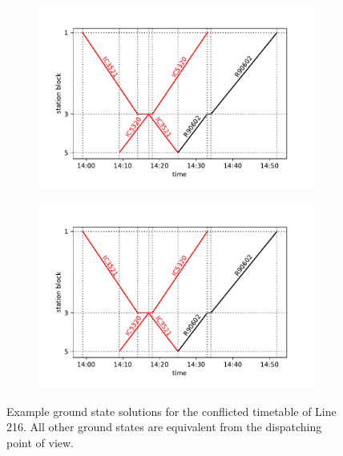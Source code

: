 \begin{figure}[t]
  \begin{subfigure}[b]{0.5\textwidth}
    \caption{}
    \includegraphics[width=\textwidth]{figures/dwave_line216_ground1}
  \end{subfigure}
  \begin{subfigure}[b]{0.5\textwidth}
    \caption{}
    \includegraphics[width=\textwidth]{figures/dwave_line216_ground1.pdf}
  \end{subfigure}
  \caption{Example ground state solutions for the conflicted timetable of Line 216. All
    other ground states are equivalent from the dispatching point of view.}
  \label{fig:dwline216grounds}
\end{figure}

